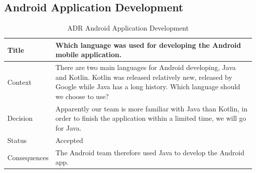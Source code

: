 \documentclass[12pt,a4paper]{article}
\begin{document}
\begin{appendices}
          \subsection{Android Application Development}
            \begin{table}[H]
              \centering
                \begin{tabularx}{\textwidth}{l X}
                  \hline
                  Title & Which language was used for developing the Android mobile application. \\ \hline
                  Context & There are two main languages for Android developing, Java and Kotlin. Kotlin was released relatively new, released by Google while Java has a long history. Which language should we choose to use?\\ 
                  Decision & Apparently our team is more familiar with Java than Kotlin, in order to finish the application within a limited time, we will go for Java.  \\ 
                  Status & Accepted \\ 
                  Consequences & The Android team therefore used Java to develop the Android app.  \\
                  \hline
                \end{tabularx}
                \caption[Table caption text]{ADR Android Application Development}
                \label{table:ADR Android Application Development}
            \end{table}


\end{appendices}
\end{document}
